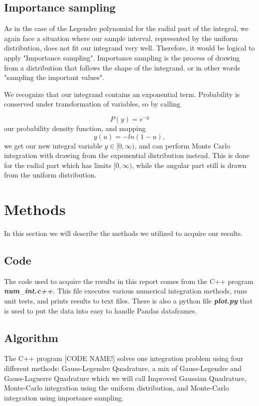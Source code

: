 \documentclass{emulateapj}
\begin{document}
\subsection{Importance sampling}
As in the case of the Legendre polynomial for the radial part of the integral, we again face a situation where our sample interval, represented by the uniform distribution, does not fit our integrand very well. Therefore, it would be logical to apply "Importance sampling". Importance sampling is the process of drawing from a distribution that follows the shape of the integrand, or in other words "sampling the important values".

We recognize that our integrand contains an exponential term. Probability is conserved under transformation of variables, so by calling

\begin{equation}
    P(y) = e^{-y}
\end{equation}
our probability density function, and mapping
\begin{equation}
    y(u) = -ln\left(1-u\right),
\end{equation}
we get our new integral variable $y\in [0,\infty)$, and can perform Monte Carlo integration with drawing from the exponential distribution instead. This is done for the radial part which has limits $[0,\infty)$, while the angular part still is drawn from the uniform distribution.

\section{Methods}
\label{sec:methods}
In this section we will describe the methods we utilized to acquire our results.
\subsection{Code}
The code used to acquire the results in this report comes from the C++ program \textbf{\textit{num}}\_\textbf{\textit{int.c++}}. This file executes various numerical integration methods, runs unit tests, and prints results to text files. There is also a python file \textbf{\textit{plot.py}} that is used to put the data into easy to handle Pandas dataframes.

\subsection{Algorithm}
The C++ program [CODE NAME!] solves one integration problem using four different methods: Gauss-Legendre Quadrature, a mix of Gauss-Legendre and Gauss-Laguerre Quadrature which we will call Improved Gaussian Quadrature, Monte-Carlo integration using the uniform distribution, and Monte-Carlo integration using importance sampling.
\end{document}
